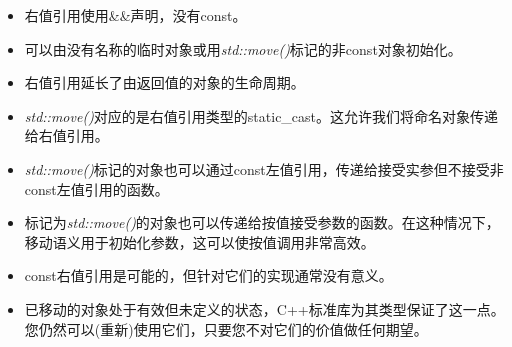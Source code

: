 \begin{itemize}
	\item 右值引用使用\&\&声明，没有const。
	\item 可以由没有名称的临时对象或用\textit{std::move()}标记的非const对象初始化。
	\item 右值引用延长了由返回值的对象的生命周期。
	\item \textit{std::move()}对应的是右值引用类型的static\_cast。这允许我们将命名对象传递给右值引用。
	\item \textit{std::move()}标记的对象也可以通过const左值引用，传递给接受实参但不接受非const左值引用的函数。
	\item 标记为\textit{std::move()}的对象也可以传递给按值接受参数的函数。在这种情况下，移动语义用于初始化参数，这可以使按值调用非常高效。
	\item const右值引用是可能的，但针对它们的实现通常没有意义。
	\item 已移动的对象处于有效但未定义的状态，C++标准库为其类型保证了这一点。您仍然可以(重新)使用它们，只要您不对它们的价值做任何期望。
\end{itemize}

\newpage